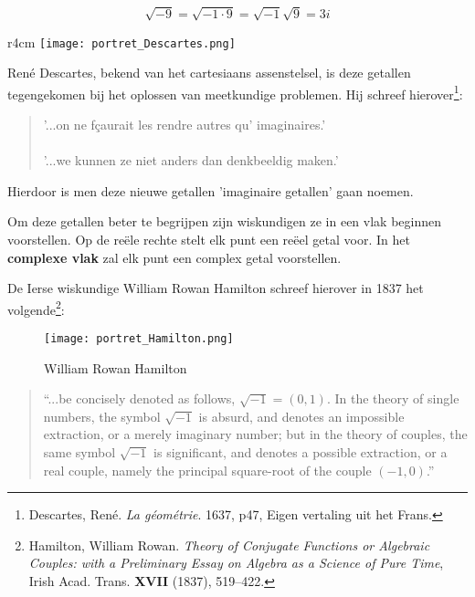 \documentclass{ximera}
\begin{document}
\[ \sqrt{-9} = \sqrt{-1 \cdot 9} = \sqrt{-1} \sqrt{9} = 3i  \]

{
\begin{wrapfigure}{r}{4cm} 
    \texttt{[image: portret\_Descartes.png]}
\end{wrapfigure}

René Descartes, bekend van het cartesiaans assenstelsel, is deze getallen tegengekomen bij het oplossen van meetkundige problemen. Hij schreef hierover\footnote{
    Descartes, René. \textit{La géométrie}. 1637, p47, Eigen vertaling uit het Frans.
    }: 
    
    
    
    
    \begin{quote}
        '...on ne fçaurait les rendre autres qu’ imaginaires.' 
        \\
        \\
        '...we kunnen ze niet anders dan denkbeeldig maken.'
    \end{quote}
    
    
    Hierdoor is men deze nieuwe getallen 'imaginaire getallen' gaan noemen. 
    \vspace{2cm}
    
}

    
    Om deze getallen beter te begrijpen zijn wiskundigen ze in een vlak beginnen voorstellen. Op de reële rechte stelt elk punt een reëel getal voor. In het \textbf{complexe vlak} zal elk punt een complex getal voorstellen. 
    
    
    
    De Ierse wiskundige William Rowan Hamilton schreef hierover in 1837 het volgende\footnote{
        Hamilton, William Rowan. \textit{Theory of Conjugate Functions or Algebraic
        Couples: with a Preliminary Essay on Algebra as a Science of Pure
        Time}, Irish Acad. Trans. \textbf{XVII} (1837), 519–422.}:   
    \begin{figure}[H]
        \centering
        \texttt{[image: portret\_Hamilton.png]}
        \caption{William Rowan Hamilton}
    \end{figure}

    \begin{quote}
        “...be concisely denoted as follows, \(\sqrt{-1} = (0, 1)\). In the theory of single numbers, the symbol \(\sqrt{-1}\) is absurd, and denotes an impossible extraction, or a merely imaginary number; but in the theory of couples, the same symbol \(\sqrt{-1}\) is significant, and denotes a possible extraction, or a real couple, namely the principal square-root of the couple \((-1,0)\).”
    \end{quote}
    
\end{document}
